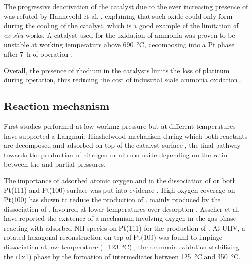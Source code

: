 The progressive deactivation of the catalyst due to the ever increasing presence of  \parencite{McCabe1986} was refuted by Hannevold et al. \parencite*{Hannevold2005}, explaining that such oxide could only form during the cooling of the catalyst, which is a good example of the limitation of \textit{ex-situ} works.
A  catalyst used for the oxidation of ammonia was proven to be unstable at working temperature above \qty{690}{\degreeCelsius}, decomposing into a Pt phase after \qty{7}{\hour} of operation \parencite{Zakharchenko2001}.

Overall, the presence of rhodium in the catalysts limits the loss of platinum during operation, thus reducing the cost of industrial scale ammonia oxidation \parencite{Hatscher2008}.

\subsection{Reaction mechanism}\label{sec:Mechanism}

First studies performed at low working pressure but at different temperatures have supported a Langmuir-Hinshelwood mechanism during which both reactants are decomposed and adsorbed on top of the catalyst surface \parencite{Nutt1969, Pignet1974, Ostermaier1974, Pignet1975, Gland1978a}, the final pathway towards the production of nitrogen or nitrous oxide depending on the ratio between the  and  partial pressures.

The importance of adsorbed atomic oxygen and  in the dissociation of  on both Pt(111) \parencite{Mieher1995} and Pt(100) surface was put into evidence \parencite{Bradley1995, Bradley1997, vandenBroek1999, Kim2000}.
High oxygen coverage on Pt(100) has shown to reduce the production of , mainly produced by the dissociation of , favoured at lower temperatures over  desorption \parencite{Bradley1995}.
Asscher et al. \parencite*{Asscher1984} have reported the existence of a mechanism involving oxygen in the gas phase reacting with adsorbed NH species on Pt(111) for the production of .
At UHV, a rotated hexagonal reconstruction on top of Pt(100) was found to impinge  dissociation at low temperature (\qty{-123}{\degreeCelsius}) \parencite{Bradley1997}, the ammonia oxidation stabilising the (1x1) phase \parencite{Rafti2007} by the formation of  intermediates between \qty{125}{\degreeCelsius} and \qty{350}{\degreeCelsius}.

